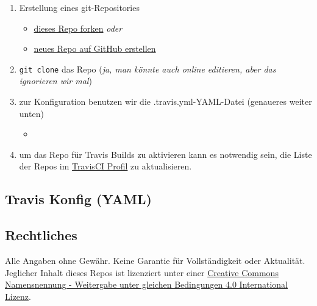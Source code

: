 \documentclass[]{article}
\providecommand{\tightlist}{%
  \setlength{\itemsep}{0pt}\setlength{\parskip}{0pt}}
\begin{document}
\begin{enumerate}
\def\labelenumi{\arabic{enumi}.}
\tightlist
\item
  Erstellung eines git-Repositories

  \begin{itemize}
  \tightlist
  \item
    \href{https://github.com/SimonWaldherr/testrepo\#fork-destination-box}{dieses
    Repo forken} \emph{oder}
  \item
    \href{https://github.com/new}{neues Repo auf GitHub erstellen}
  \end{itemize}
\item
  \texttt{git\ clone} das Repo (\emph{ja, man könnte auch online
  editieren, aber das ignorieren wir mal})
\item
  zur Konfiguration benutzen wir die .travis.yml-YAML-Datei (genaueres
  weiter unten)

  \begin{itemize}
  \item
  \end{itemize}
\item
  um das Repo für Travis Builds zu aktivieren kann es notwendig sein,
  die Liste der Repos im \href{https://travis-ci.org/profile}{TravisCI
  Profil} zu aktualisieren.
\end{enumerate}

\subsection{Travis Konfig (YAML)}\label{travis-konfig-yaml}



\subsection{Rechtliches}\label{rechtliches}

Alle Angaben ohne Gewähr. Keine Garantie für Vollständigkeit oder
Aktualität. Jeglicher Inhalt dieses Repos ist lizenziert unter einer
\href{http://creativecommons.org/licenses/by-sa/4.0/}{Creative Commons
Namensnennung - Weitergabe unter gleichen Bedingungen 4.0 International
Lizenz}.
\end{document}
